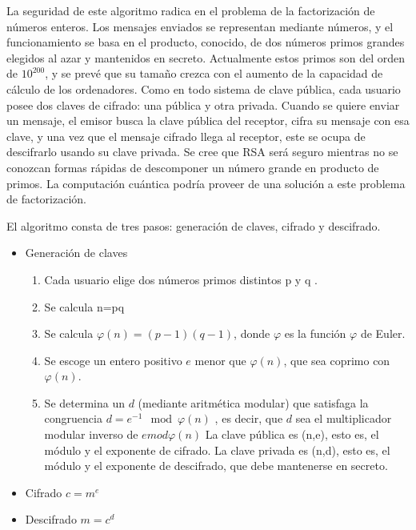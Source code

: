 \documentclass[spanish]{article}
\begin{document}
La seguridad de este algoritmo radica en el problema de la factorización de números enteros. Los mensajes enviados se representan mediante números, y el funcionamiento se basa en el producto, conocido, de dos números primos grandes elegidos al azar y mantenidos en secreto. Actualmente estos primos son del orden de $10^{200}$, y se prevé que su tamaño crezca con el aumento de la capacidad de cálculo de los ordenadores.
Como en todo sistema de clave pública, cada usuario posee dos claves de cifrado: una pública y otra privada. Cuando se quiere enviar un mensaje, el emisor busca la clave pública del receptor, cifra su mensaje con esa clave, y una vez que el mensaje cifrado llega al receptor, este se ocupa de descifrarlo usando su clave privada.
Se cree que RSA será seguro mientras no se conozcan formas rápidas de descomponer un número grande en producto de primos. La computación cuántica podría proveer de una solución a este problema de factorización.

El algoritmo consta de tres pasos: generación de claves, cifrado y descifrado.

\begin{itemize}
\item Generación de claves
\begin{enumerate}
\item Cada usuario elige dos números primos distintos p  y q .
\item Se calcula n=pq
\item Se calcula $\varphi (n)=(p-1)(q-1)$, donde $\varphi$ es la función $\varphi$ de Euler.
\item Se escoge un entero positivo $e$  menor que $\varphi (n)$, que sea coprimo con $\varphi (n)$.
\item Se determina un $d$  (mediante aritmética modular) que satisfaga la congruencia $d =  e^{-1}\mod\varphi(n)$ , es decir, que $d$  sea el multiplicador modular inverso de $emod\varphi(n)$ 
La clave pública es (n,e), esto es, el módulo y el exponente de cifrado. La clave privada es (n,d), esto es, el módulo y el exponente de descifrado, que debe mantenerse en secreto.
\end{enumerate}
\item Cifrado
$c = m^{e}$
\item  Descifrado
$m = c^{d}$
\end{itemize}
\end{document}
